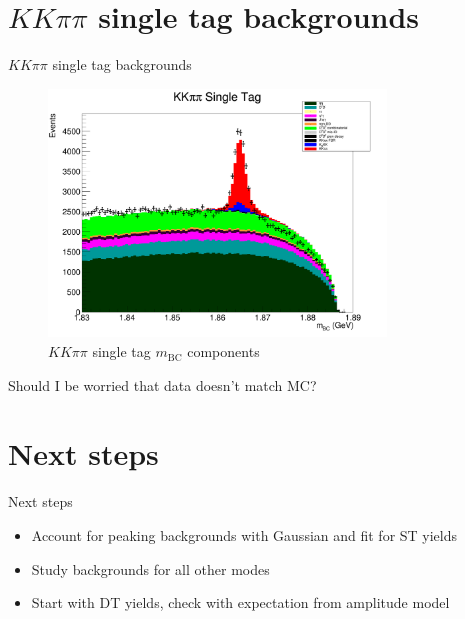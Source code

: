 \documentclass{beamer}
\begin{document}
\section{$KK\pi\pi$ single tag backgrounds}
\begin{frame}{$KK\pi\pi$ single tag backgrounds}
  \begin{figure}
    \centering
    \includegraphics[width=0.8\textwidth]{MCPlusData.png}
    \caption{$KK\pi\pi$ single tag $m_\text{BC}$ components}
  \end{figure}
  Should I be worried that data doesn't match MC?
\end{frame}

\section{Next steps}
\begin{frame}{Next steps}
  \begin{itemize}
    \setlength\itemsep{2em}
    \item{Account for peaking backgrounds with Gaussian and fit for ST yields}
    \item{Study backgrounds for all other modes}
    \item{Start with DT yields, check with expectation from amplitude model}
  \end{itemize}
\end{frame}
\end{document}

